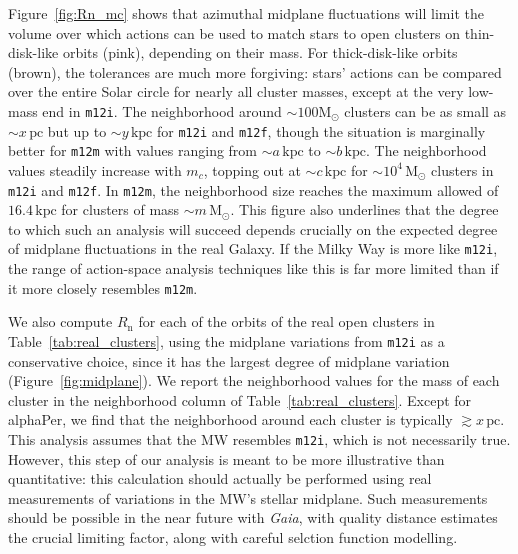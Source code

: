 \documentclass[twocolumn]{aastex62}
\newcommand{\Msun}{\ensuremath{\text{M}_\odot}}
\newcommand{\pc}{\text{pc}}
\newcommand{\kpc}{\text{kpc}}
\newcommand{\mi}{\texttt{m12i}}
\newcommand{\mf}{\texttt{m12f}}
\newcommand{\mm}{\texttt{m12m}}
\newcommand{\n}{\text{n}}
\newcommand{\thincolor}{pink}
\newcommand{\thickcolor}{brown}
\begin{document}
Figure~\ref{fig:Rn_mc} shows that azimuthal midplane fluctuations will limit
the volume over which actions can be used to match stars to open clusters on
thin-disk-like orbits (\thincolor), depending on their mass. For
thick-disk-like orbits (\thickcolor), the tolerances are much more forgiving:
stars' actions can be compared over the entire Solar circle for nearly all
cluster masses, except at the very low-mass end in \mi . The neighborhood
around $\sim100\Msun$ clusters can be as small as $\sim x\,\pc$ but up to
$\sim y\,\kpc$ for \mi{} and \mf{}, though the situation is marginally better
for \mm{} with values ranging from $\sim a\,\kpc$ to $\sim b\,\kpc$. The
neighborhood values steadily increase with $m_c$, topping out at $\sim c\,\kpc$
for $\sim10^4\,\Msun$ clusters in
\mi{} and \mf{}. In \mm{}, the neighborhood size reaches the maximum allowed of
$16.4\,\kpc$ for clusters of mass $\sim m\,\Msun$. This figure also
underlines that the degree to which such an analysis will succeed depends
crucially on the expected degree of midplane fluctuations in the real Galaxy.
If the Milky Way is more like \mi , the range of action-space analysis
techniques like this is far more limited than if it more closely resembles
\mm{}.

We also compute $R_{\n}$ for each of the orbits of the real open clusters in
Table~\ref{tab:real_clusters}, using the midplane variations from
\mi{} as a conservative choice, since it has the largest degree of
midplane variation (Figure~\ref{fig:midplane}). We report the neighborhood
values for the mass of each cluster in the neighborhood column of
Table~\ref{tab:real_clusters}. Except for alphaPer, we find that the
neighborhood around each cluster is typically $\gtrsim x\,\pc$. This analysis
assumes that the MW resembles \mi{}, which is not necessarily true. However,
this step of our analysis is meant to be more illustrative than quantitative:
this calculation should actually be performed using real measurements of
variations in the MW's stellar midplane. Such measurements should be possible
in the near future with {\em Gaia}, with quality distance estimates the
crucial limiting factor, along with careful selction function modelling.
\end{document}
